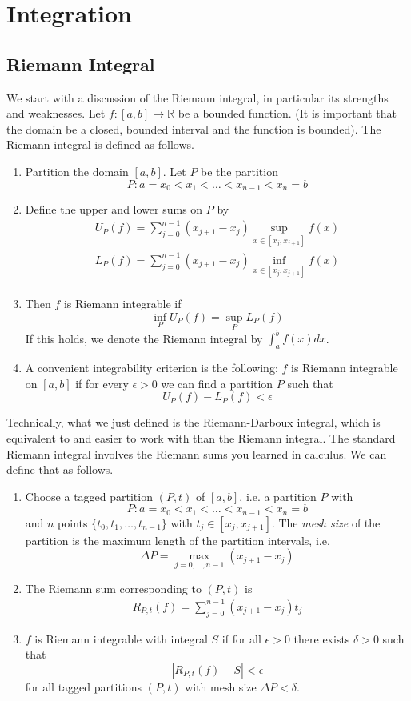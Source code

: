 \documentclass[12pt]{amsart}         %
\theoremstyle{remark}
\newcommand{\R}{\mathbb{R}}
\begin{document}
\section{Integration}

\subsection{Riemann Integral}

We start with a discussion of the Riemann integral, in particular its strengths and weaknesses. Let $f: [a, b] \rightarrow \R$ be a bounded function. (It is important that the domain be a closed, bounded interval and the function is bounded). The Riemann integral is defined as follows.
\begin{enumerate}
    \item Partition the domain $[a,b]$. Let $P$ be the partition
    \[
    P: a = x_0 < x_1 < \dots < x_{n-1} < x_n = b
    \]
    \item Define the upper and lower sums on $P$ by
    \begin{align*}
        U_P(f) = \sum_{j = 0}^{n-1} (x_{j+1} - x_j) \sup_{x \in [x_j, x_{j+1}]} f(x) \\
        L_P(f) = \sum_{j = 0}^{n-1} (x_{j+1} - x_j) \inf_{x \in [x_j, x_{j+1}]} f(x) \\
    \end{align*}
    \item Then $f$ is Riemann integrable if
    \[
    \inf_P U_P(f) = \sup_P L_P(f)
    \]
    If this holds, we denote the Riemann integral by $\int_a^b f(x) dx$.
    \item A convenient integrability criterion is the following: $f$ is Riemann integrable on $[a, b]$ if for every $\epsilon > 0$ we can find a partition $P$ such that
    \[
    U_P(f) - L_P(f) < \epsilon
    \]
\end{enumerate}
Technically, what we just defined is the Riemann-Darboux integral, which is equivalent to and easier to work with than the Riemann integral. The standard Riemann integral involves the Riemann sums you learned in calculus. We can define that as follows.
\begin{enumerate}
    \item Choose a tagged partition $(P, t)$ of $[a, b]$, i.e. a partition $P$ with
    \[
    P: a = x_0 < x_1 < \dots < x_{n-1} < x_n = b
    \]
    and $n$ points $\{ t_0, t_1, \dots, t_{n-1} \}$ with $t_j \in [x_j, x_{j+1}]$. The \emph{mesh size} of the partition is the maximum length of the partition intervals, i.e.
    \[
    \Delta P = \max_{j = 0, \dots, n-1}(x_{j+1} - x_j)
    \]
    \item The Riemann sum corresponding to $(P, t)$ is    
    \begin{align*}
        R_{P,t}(f) = \sum_{j = 0}^{n-1} (x_{j+1} - x_j) t_j
    \end{align*}
    \item $f$ is Riemann integrable with integral $S$ if for all $\epsilon > 0$ there exists $\delta > 0$ such that
    \[
    |R_{P, t}(f) - S| < \epsilon
    \]
    for all tagged partitions $(P, t)$ with mesh size $\Delta P < \delta$. 
\end{enumerate}
\end{document}
